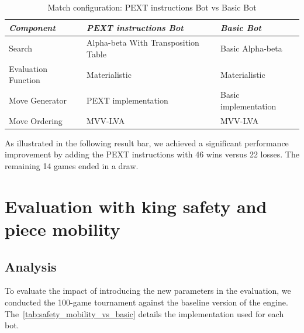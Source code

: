 \begin{table}
    \centering
    \begin{tabular}{|p{4cm}|p{4cm}|p{4cm}|}
    \hline
    \textit{Component}         & \textit{PEXT instructions Bot}  & \textit{Basic Bot}     \\ \hline
    Search                     & Alpha-beta With Transposition Table          & Basic Alpha-beta           \\ \hline
    Evaluation Function        & Materialistic                      & Materialistic       \\ \hline
    Move Generator             & PEXT implementation              & Basic implementation   \\ \hline
    Move Ordering              & MVV-LVA                           & MVV-LVA                \\ \hline
    \end{tabular}
    \caption{Match configuration: PEXT instructions Bot vs Basic Bot}\label{tab:pext_vs_basic}
\end{table}

\noindent As illustrated in the following result bar, we achieved a significant performance improvement by adding the PEXT instructions with 46 wins versus 22 losses. The remaining 14 games ended in a draw.

\begin{center}
\medskip
\end{center}

\section{Evaluation with king safety and piece mobility}

\subsection*{Analysis}

To evaluate the impact of introducing the new parameters in the evaluation, we conducted the 100-game tournament against the baseline version of the engine. The~\cref{tab:safety_mobility_vs_basic} details the implementation used for each bot.

\vspace{1em}

